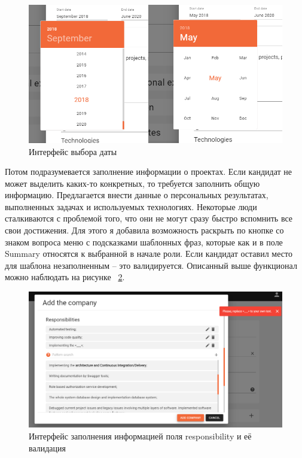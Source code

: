 \documentclass[a4paper,12pt]{diplom}
\begin{document}
\begin{figure}[!ht]
\centering
\includegraphics[width=1\textwidth]{resources/dates.png}
\caption{Интерфейс выбора даты}
\label{10}
\end{figure}

Потом подразумевается заполнение информации о проектах. Если кандидат не может выделить каких-то конкретных, то требуется заполнить общую информацию. Предлагается внести данные о персональных результатах, выполненных задачах и используемых технологиях.
Некоторые люди сталкиваются с проблемой того, что они не могут сразу быстро вспомнить все свои достижения.
Для этого я добавила возможность раскрыть по кнопке со знаком вопроса меню с подсказками шаблонных фраз, которые как и в поле Summary относятся к выбранной в начале роли. Если кандидат оставил место для шаблона незаполненным -- это валидируется.
Описанный выше функционал можно наблюдать на рисунке ~\ref{11}.

\begin{figure}[!ht]
\centering
\includegraphics[width=1\textwidth]{resources/responsibility.png}
\caption{Интерфейс заполнения информацией поля responsibility и её валидация}
\label{11}
\end{figure}
\end{document}
